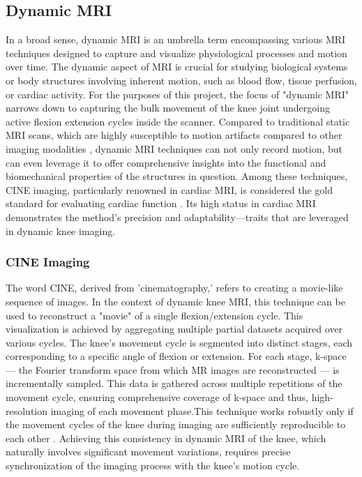\documentclass{micro-econ-thesis}
\begin{document}
\subsection{Dynamic MRI}
In a broad sense, dynamic MRI is an umbrella term encompassing various MRI techniques designed to capture and visualize physiological processes and motion over time. The dynamic aspect of MRI is crucial for studying biological systems or body structures involving inherent motion, such as blood flow, tissue perfusion, or cardiac activity. For the purposes of this project, the focus of "dynamic MRI" narrows down to capturing the bulk movement of the knee joint undergoing active flexion extension cycles inside the scanner. Compared to traditional static MRI scans, which are highly susceptible to motion artifacts compared to other imaging modalities \parencite{zaitsev_motion_2015}, dynamic MRI techniques can not only record motion, but can even leverage it to offer comprehensive insights into the functional and biomechanical properties of the structures in question.  Among these techniques, CINE imaging, particularly renowned in cardiac MRI, is considered the gold standard for evaluating cardiac function \parencite{menchon-lara_reconstruction_2019}. Its high status in cardiac MRI demonstrates the method's precision and adaptability—traits that are leveraged in dynamic knee imaging.

\subsubsection{CINE Imaging}

The word CINE, derived from 'cinematography,' refers to creating a movie-like sequence of images. In the context of dynamic knee MRI, this technique can be used to reconstruct a "movie" of a single flexion/extension cycle. This visualization is achieved by aggregating multiple partial datasets acquired over various cycles. The knee's movement cycle is segmented into distinct stages, each corresponding to a specific angle of flexion or extension. For each stage, k-space — the Fourier transform space from which MR images are reconstructed — is incrementally sampled. This data is gathered across multiple repetitions of the movement cycle, ensuring comprehensive coverage of k-space and thus, high-resolution imaging of each movement phase.This technique works robustly only if the movement cycles of the knee during imaging are sufficiently reproducible to each other \parencite{curtis_primer_2022}. Achieving this consistency in dynamic MRI of the knee, which naturally involves significant movement variations, requires precise synchronization of the imaging process with the knee's motion cycle. 
\end{document}
